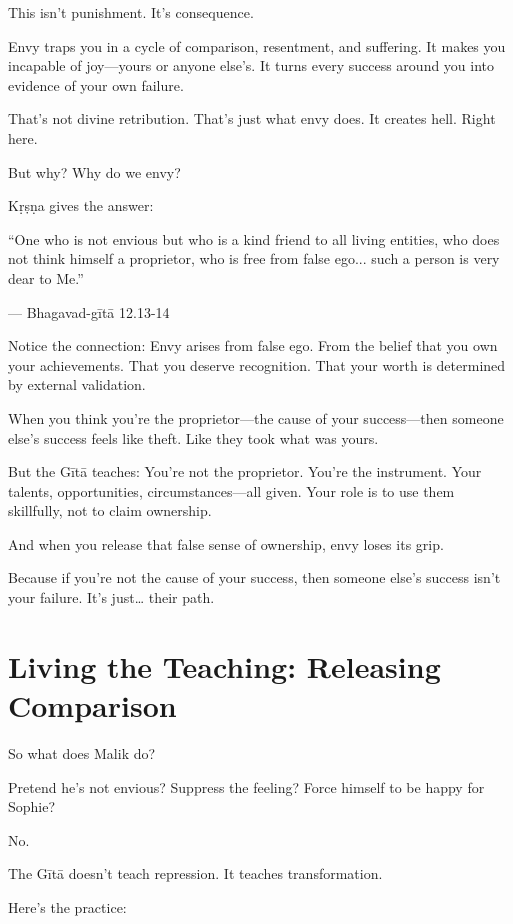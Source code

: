 \documentclass[11pt,twoside]{book}
\begin{document}
This isn't punishment. It's consequence.

Envy traps you in a cycle of comparison, resentment, and suffering. It makes you incapable of joy—yours or anyone else's. It turns every success around you into evidence of your own failure.

That's not divine retribution. That's just what envy does. It creates hell. Right here.

But why? Why do we envy?

Kṛṣṇa gives the answer:

\begin{pullquote}
``One who is not envious but who is a kind friend to all living entities, who does not think himself a proprietor, who is free from false ego... such a person is very dear to Me.''

--- Bhagavad-gītā 12.13-14
\end{pullquote}

Notice the connection: Envy arises from false ego. From the belief that you own your achievements. That you deserve recognition. That your worth is determined by external validation.

When you think you're the proprietor—the cause of your success—then someone else's success feels like theft. Like they took what was yours.

But the Gītā teaches: You're not the proprietor. You're the instrument. Your talents, opportunities, circumstances—all given. Your role is to use them skillfully, not to claim ownership.

And when you release that false sense of ownership, envy loses its grip.

Because if you're not the cause of your success, then someone else's success isn't your failure. It's just\ldots{} their path.

\section*{Living the Teaching: Releasing Comparison}

So what does Malik do?

Pretend he's not envious? Suppress the feeling? Force himself to be happy for Sophie?

No.

The Gītā doesn't teach repression. It teaches transformation.

Here's the practice:
\end{document}
